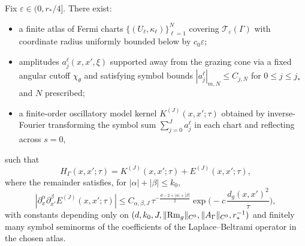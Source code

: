 \begin{theorem}
\label{thm:levi-parametrix}
Fix $\varepsilon\in(0,r_*/4]$. There exist:
\begin{itemize}
\item a finite atlas of Fermi charts $\{(U_\ell,\kappa_\ell)\}_{\ell=1}^N$ covering $\mathcal T_\varepsilon(\Gamma)$ with coordinate radius uniformly bounded below by $c_0\varepsilon$;
\item amplitudes $a_j^\ell(x,x',\xi)$ supported away from the grazing cone via a fixed angular cutoff $\chi_\theta$ and satisfying symbol bounds $|a_j^\ell|_{m,N}\le C_{j,N}$ for $0\le j\le j_*$ and $N$ prescribed;
\item a finite-order oscillatory model kernel $K^{(J)}(x,x';\tau)$ obtained by inverse-Fourier transforming the symbol sum $\sum_{j=0}^J a_j^\ell$ in each chart and reflecting across $s=0$,
\end{itemize}
such that
\[
H_\Gamma(x,x';\tau) = K^{(J)}(x,x';\tau) + E^{(J)}(x,x';\tau),
\]
where the remainder satisfies, for $|\alpha|+|\beta|\le k_0$,
\[
|\partial_x^\alpha \partial_{x'}^\beta E^{(J)}(x,x';\tau)|
\le C_{\alpha,\beta,J}\,\tau^{-\frac{d-2+|\alpha|+|\beta|}{2}} \exp\!\Big(-c\,\frac{d_g(x,x')^2}{\tau}\Big),
\]
with constants depending only on $(d,k_0,J,\|{\rm Rm}_g\|_{C^0},\|A_\Gamma\|_{C^0},r_*^{-1})$ and finitely many symbol seminorms of the coefficients of the Laplace–Beltrami operator in the chosen atlas.
\end{theorem}

